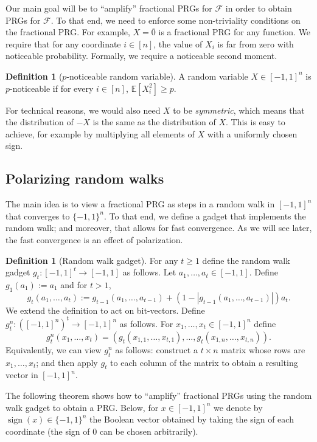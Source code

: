 \documentclass[11pt]{article}
\numberwithin{equation}{section}
\theoremstyle{definition}
\newtheorem{definition}[theorem]{Definition}
\theoremstyle{plain}
\newcommand{\E}{\mathbb{E}}
\newcommand{\FF}{\mathcal{F}}
\DeclareMathOperator{\sign}{sign}     %
\newcommand{\zero}{\overline{0}}
\begin{document}
Our main goal will be to ``amplify'' fractional PRGs for $\FF$ in order to obtain PRGs for $\FF$. To that end, we need to enforce some non-triviality
conditions on the fractional PRG\@. For example, $X=\zero$ is a fractional PRG for any function. We require that for any coordinate $i \in [n]$,
the value of $X_i$ is far from zero with noticeable probability. Formally, we require a noticeable second moment.

\begin{definition}[$p$-noticeable random variable]
A random variable $X \in [-1,1]^n$ is $p$-noticeable if for every $i \in [n]$, $\E[X_i^2] \ge p$.
\end{definition}

For technical reasons, we would also need $X$ to be \emph{symmetric}, which means that the distribution of $-X$ is the same
as the distribution of $X$. This is easy to achieve, for example by multiplying all elements of $X$ with a uniformly chosen sign.

\subsection{Polarizing random walks}
The main idea is to view a fractional PRG as steps in a random walk in $[-1,1]^n$ that converges to $\{-1,1\}^n$.
To that end, we define a gadget that implements the random walk; and moreover, that allows for fast convergence. As we will see later, the fast convergence is an effect of polarization.


\begin{definition}[Random walk gadget]
For any $t \ge 1$ define the random walk gadget $g_t:[-1,1]^t \to [-1,1]$ as follows.
Let $a_1,\ldots,a_t \in [-1,1]$.
Define $g_1(a_1):=a_1$ and for $t>1$,
$$
g_t(a_1,\ldots,a_t) := g_{t-1}(a_1,\ldots,a_{t-1}) + (1-|g_{t-1}(a_1,\ldots,a_{t-1})|) a_t.
$$
We extend the definition to act on bit-vectors.
Define $g_t^n:([-1,1]^n)^t \to [-1,1]^n$ as follows. For $x_1,\ldots,x_t \in [-1,1]^n$ define
$$
g_t^n(x_1,\ldots,x_t) = \left(g_t(x_{1,1},\ldots,x_{t,1}),\ldots,g_t(x_{1,n},\ldots,x_{t,n})\right).
$$
Equivalently, we can view $g_t^n$ as follows: construct a $t \times n$ matrix whose rows are $x_1,\ldots,x_t$; and
then apply $g_t$ to each column of the matrix to obtain a resulting vector in $[-1,1]^n$.
\end{definition}

The following theorem shows how to ``amplify'' fractional PRGs using the random walk gadget to obtain a PRG\@.
Below, for $x \in [-1,1]^n$ we denote by $\sign(x) \in \{-1,1\}^n$ the Boolean vector obtained by taking
the sign of each coordinate (the sign of $0$ can be chosen arbitrarily).
\end{document}
